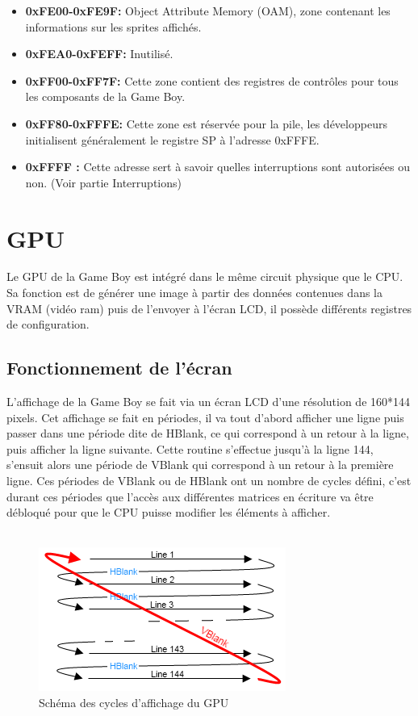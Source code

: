 \documentclass[french]{report}
\begin{document}
\begin{itemize}
\item \textbf{0xFE00-0xFE9F:} Object Attribute Memory (OAM), zone contenant les informations
sur les sprites affichés.
\item \textbf{0xFEA0-0xFEFF:} Inutilisé.
\item \textbf{0xFF00-0xFF7F:} Cette zone contient des registres de contrôles pour tous les composants de la
Game Boy.
\item \textbf{0xFF80-0xFFFE:} Cette zone est réservée pour la pile, les
développeurs initialisent généralement le registre SP à l'adresse 0xFFFE.
\item \textbf{0xFFFF :} Cette adresse sert à savoir quelles interruptions sont autorisées ou
non. (Voir partie Interruptions)
\end{itemize} 


\section{GPU}

Le \gls{GPU} de la Game Boy est intégré dans le même circuit physique que le CPU. Sa fonction est de générer une image à partir des données contenues dans la \gls{VRAM} (vidéo ram) puis de l'envoyer à l'écran LCD, il possède différents registres de configuration.

\subsection{Fonctionnement de l'écran}

L'affichage de la Game Boy se fait via un écran LCD d'une résolution de 160*144 pixels. Cet affichage se fait en périodes, il va tout d'abord afficher une ligne puis passer dans une période dite de HBlank, ce qui correspond à un retour à la ligne, puis afficher la ligne suivante. Cette routine s'effectue jusqu'à la ligne 144, s'ensuit alors une période de VBlank qui correspond à un retour à la première ligne.
Ces périodes de VBlank ou de HBlank ont un nombre de cycles défini, c'est
durant ces périodes que l'accès aux différentes matrices en écriture va être
débloqué pour que le CPU puisse modifier les éléments à afficher.\\\\

\begin{figure}[!h]
\centering
\includegraphics[scale=0.8]{images/gpu_cycles.png}
\caption{Schéma des cycles d'affichage du GPU}
\label{gpucycles}
\end{figure}
\end{document}
